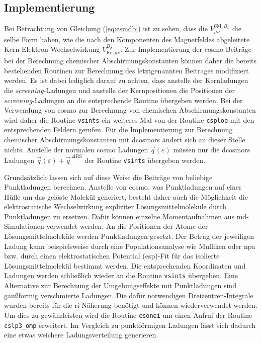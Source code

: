 	\subsection{Implementierung}\label{kap:cosmoimp}
	Bei Betrachtung von Gleichung (\ref{eq:esmdb}) ist zu sehen, dass die $V_{\mu\nu}^{\textrm{SM},B_\beta}$ die selbe Form haben, wie die nach den Komponenten des Magnetfeldes abgeleitete Kern-Elektron-Wechselwirkung $V_{\textrm{Ke},\mu\nu}^{B_\beta}$. Zur Implementierung der \ac{cosmo} Beiträge bei der Berechnung chemischer Abschirmungskonstanten können daher die bereits bestehenden Routinen zur Berechnung des letztgenannten Beitrages modifiziert werden. Es ist dabei lediglich darauf zu achten, dass anstelle der Kernladungen die \textit{screening}-Ladungen und anstelle der Kernpositionen die Positionen der \textit{screening}-Ladungen an die entsprechende Routine übergeben werden. Bei der Verwendung von \ac{cosmo} zur Berechnung von chemischen Abschirmungskonstanten wird daher die Routine \texttt{vsints} ein weiteres Mal von der Routine \texttt{csplop} mit den entsprechenden Feldern gerufen. Für die Implementierung zur Berechnung chemischer Abschirmungskonstanten mit \ac{dcosmors} ändert sich an dieser Stelle nichts. Anstelle der normalen \ac{cosmo} Ladungen $\vec{q}(\varepsilon)$ müssen nur die \ac{dcosmors} Ladungen $\vec{q}(\varepsilon)+\vec{q}^{\,\Delta\textrm{RS}}$ der Routine \texttt{vsints} übergeben werden.
	
Grundsätzlich lassen sich auf diese Weise die Beiträge von beliebige Punktladungen berechnen. Anstelle von \ac{cosmo}, was Punktladungen auf einer Hülle um das gelöste Molekül generiert, besteht daher auch die Möglichkeit die elektrostatische Wechselwirkung expliziter Lösungsmittelmoleküle durch Punktladungen zu ersetzen. Dafür können einzelne Momentaufnahmen aus \ac{md}-Simulationen verwendet werden. An die Positionen der Atome der Lösungsmittelmoleküle werden Punktladungen gesetzt. Der Betrag der jeweiligen Ladung kann beispielsweise durch eine Populationsanalyse wie Mulliken\supercite{mulliken1955electronic} oder \ac{npa}\supercite{reed1985natural} bzw. durch einen elektrostatischen Potential (\acs{esp})-Fit\supercite{singh1984approach} für das isolierte Lösungsmittelmolekül bestimmt werden. Die entsprechenden Koordinaten und Ladungen werden schließlich wieder an die Routine \texttt{vsints} übergeben. Eine Alternative zur Berechnung der Umgebungseffekte mit Punktladungen sind gaußförmig verschmierte Ladungen. Die dafür notwendigen Dreizentren-Integrale wurden bereits für die \ac{ri}-Näherung benötigt und können wiederverwendet werden. Um dies zu gewährleisten wird die Routine \texttt{csonei} um einen Aufruf der Routine \texttt{cslp3\_omp} erweitert. Im Vergleich zu punktförmigen Ladungen lässt sich dadurch eine etwas weichere Ladungsverteilung generieren. 

